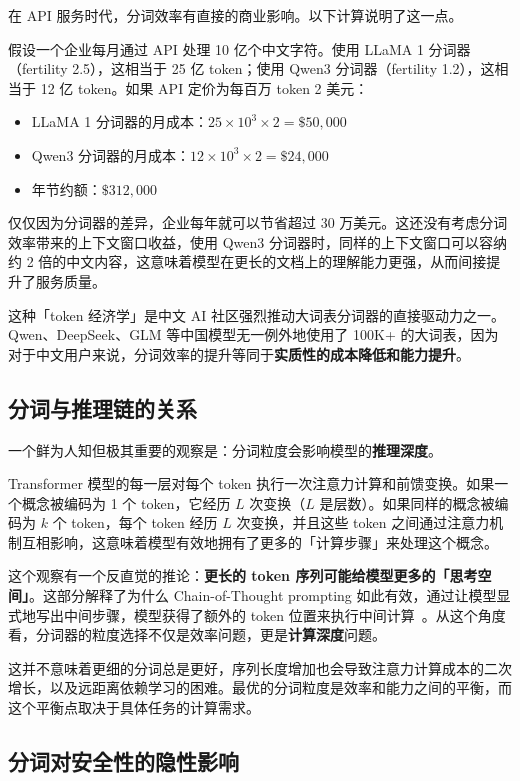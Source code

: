 在 API 服务时代，分词效率有直接的商业影响。以下计算说明了这一点。

假设一个企业每月通过 API 处理 10 亿个中文字符。使用 LLaMA 1 分词器（fertility 2.5），这相当于 25 亿 token；使用 Qwen3 分词器（fertility 1.2），这相当于 12 亿 token。如果 API 定价为每百万 token 2 美元：

\begin{itemize}[noitemsep]
  \item LLaMA 1 分词器的月成本：$25 \times 10^3 \times 2 = \$50{,}000$
  \item Qwen3 分词器的月成本：$12 \times 10^3 \times 2 = \$24{,}000$
  \item 年节约额：$\$312{,}000$
\end{itemize}

仅仅因为分词器的差异，企业每年就可以节省超过 30 万美元。这还没有考虑分词效率带来的上下文窗口收益，使用 Qwen3 分词器时，同样的上下文窗口可以容纳约 2 倍的中文内容，这意味着模型在更长的文档上的理解能力更强，从而间接提升了服务质量。

这种「token 经济学」是中文 AI 社区强烈推动大词表分词器的直接驱动力之一。Qwen、DeepSeek、GLM 等中国模型无一例外地使用了 100K+ 的大词表，因为对于中文用户来说，分词效率的提升等同于\textbf{实质性的成本降低和能力提升}。

\subsection{分词与推理链的关系}

一个鲜为人知但极其重要的观察是：分词粒度会影响模型的\textbf{推理深度}。

Transformer 模型的每一层对每个 token 执行一次注意力计算和前馈变换。如果一个概念被编码为 1 个 token，它经历 $L$ 次变换（$L$ 是层数）。如果同样的概念被编码为 $k$ 个 token，每个 token 经历 $L$ 次变换，并且这些 token 之间通过注意力机制互相影响，这意味着模型有效地拥有了更多的「计算步骤」来处理这个概念。

这个观察有一个反直觉的推论：\textbf{更长的 token 序列可能给模型更多的「思考空间」}。这部分解释了为什么 Chain-of-Thought prompting 如此有效，通过让模型显式地写出中间步骤，模型获得了额外的 token 位置来执行中间计算~\cite{wei2022cot}。从这个角度看，分词器的粒度选择不仅是效率问题，更是\textbf{计算深度}问题。

这并不意味着更细的分词总是更好，序列长度增加也会导致注意力计算成本的二次增长，以及远距离依赖学习的困难。最优的分词粒度是效率和能力之间的平衡，而这个平衡点取决于具体任务的计算需求。

\subsection{分词对安全性的隐性影响}

